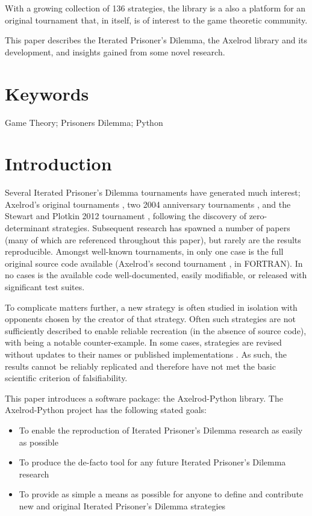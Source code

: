 \documentclass{jors}
\begin{document}
With a growing collection of 136 strategies, the library is a also a
platform for an original tournament that, in itself, is of interest to the
game theoretic community.

This paper describes the Iterated Prisoner's Dilemma, the Axelrod library
and its development, and insights gained from some novel research.

\section*{Keywords}

Game Theory; Prisoners Dilemma; Python

\section*{Introduction}

Several Iterated Prisoner's Dilemma tournaments have generated much interest;
Axelrod's original tournaments \cite{Axelrod1980a,Axelrod1980b}, two 2004
anniversary tournaments \cite{kendall2007iterated}, and the Stewart and Plotkin
2012 tournament \cite{Stewart2012}, following the discovery of zero-determinant
strategies.  Subsequent research has spawned a number of papers (many of which
are referenced throughout this paper), but rarely are the results reproducible.
Amongst well-known tournaments, in only one case is the full original source code
available (Axelrod's second tournament \cite{Axelrod1980b}, in FORTRAN). In no
cases is the available code well-documented, easily modifiable, or released
with significant test suites.

To complicate matters further, a new strategy is often studied in isolation
with opponents chosen by the creator of that strategy. Often such strategies
are not sufficiently described to enable reliable recreation (in the absence of
source code), with \cite{slany2007some} being a notable counter-example. In
some cases, strategies are revised without updates to their names or published
implementations \cite{li2007design, li2011engineering}.
As such, the results cannot be reliably replicated and therefore have not met
the basic scientific criterion of falsifiability.

This paper introduces a software package: the Axelrod-Python library. The
Axelrod-Python project has the following stated goals:

\begin{itemize}[noitemsep,topsep=0pt]
    \item To enable the reproduction of Iterated Prisoner's Dilemma
    research as easily as possible
    \item To produce the de-facto tool for any future Iterated Prisoner's
    Dilemma research
    \item To provide as simple a means as possible for anyone to define and
    contribute new and original Iterated Prisoner's Dilemma strategies
\end{itemize}
\end{document}
